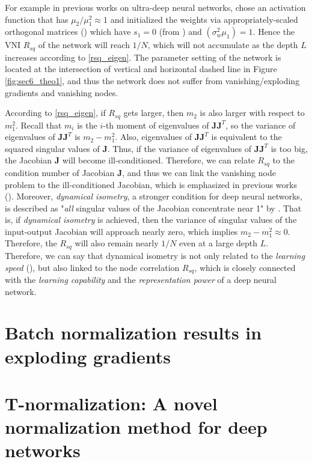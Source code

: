 For example in previous works on ultra-deep neural networks, \cite{mft:cnn} chose an activation
function that has $\mu_2/\mu_1^2\approx1$ and initialized the weights via appropriately-scaled
orthogonal matrices (\cite{mft:linear}) which have $s_1=0$ (from \cite{mft:sigmoid}) and
$(\sigma_w^2\mu_1)=1$. Hence the VNI $R_{sq}$ of the network will reach $1/N$, which will not
accumulate as the depth $L$ increases according to \eqref{rsq_eigen}. The parameter setting of the
network is located at the intersection of vertical and horizontal dashed line in Figure
\ref{fig:sec6_theo1}, and thus the network does not suffer from vanishing/exploding gradients
and vanishing nodes.

According to \eqref{rsq_eigen}, if $R_{sq}$ gets larger, then $m_2$ is also larger with respect to
$m_1^2$. Recall that $m_i$ is the $i$-th moment of eigenvalues of $\mathbf{JJ}^T$, so the variance
of eigenvalues of $\mathbf{JJ}^T$ is $m_2-m_1^2$. Also, eigenvalues of $\mathbf{JJ}^T$ is equivalent
to the squared singular values of $\mathbf{J}$. Thus, if the variance of eigenvalues of $\mathbf{JJ}^T$
is too big, the Jacobian $\mathbf{J}$ will become ill-conditioned. Therefore, we can relate $R_{sq}$
to the condition number of Jacobian $\mathbf{J}$, and thus we can link the vanishing node problem to
the ill-conditioned Jacobian, which is emphasized in previous works (\cite{mft:sigmoid, mft:spectral,
mft:linear}).
Moreover, \textit{dynamical isometry}, a stronger condition for deep neural networks, is described
as "\textit{all} singular values of the Jacobian concentrate near 1" by \cite{mft:sigmoid, mft:linear}.
That is, if \textit{dynamical isometry} is achieved, then the variance of singular values of the
input-output Jacobian will approach nearly zero, which implies $m_2-m_1^2\approx 0$. Therefore,
the $R_{sq}$ will also remain nearly $1/N$ even at a large depth $L$.
Therefore, we can say that dynamical isometry is not only related to the \textit{learning speed}
(\cite{mft:linear}), but also linked to the node correlation $R_{sq}$, which is closely connected
with the \textit{learning capability} and the \textit{representation power} of a deep neural network.



% 

\section{Batch normalization results in exploding gradients} \label{comp:bn}

\section{T-normalization: A novel normalization method for deep networks} \label{comp:tn}
